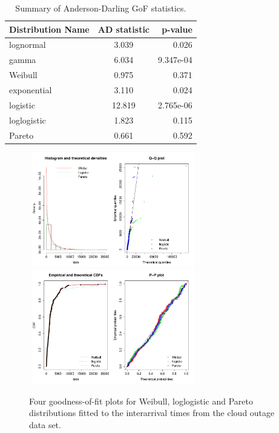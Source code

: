 \begin{table}[!ht]\centering
\caption{\label{myname_uni:tab1} Summary of Anderson-Darling GoF statistics.}
\begin{tabular}{lcr}
Distribution Name  & AD statistic & p-value \\
\hline
lognormal  & 3.039  & 0.026  \\
gamma  & 6.034  & 9.347e-04  \\ 
Weibull   & 0.975 & 0.371 \\
exponential  & 3.110  & 0.024 \\
logistic  & 12.819 & 2.765e-06  \\
loglogistic  & 1.823  & 0.115 \\
Pareto  & 0.661  & 0.592 \\
\end{tabular}
\end{table}

\begin{figure}[ht!]\centering
\includegraphics[width=7.4cm, height=5cm]{graphs/inter-arrival/Graphs1.pdf}
\includegraphics[width=7.4cm, height=5cm]{graphs/inter-arrival/Graphs2.pdf}
\caption{\label{myname_uni:fig1} Four goodness-of-fit plots for Weibull, loglogistic and Pareto distributions fitted to the interarrival times from the cloud outage data set.}
\end{figure}


